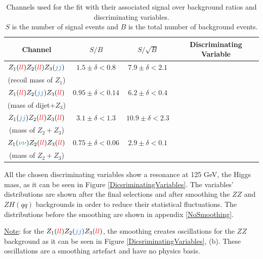 \documentclass[a4paper,11pt]{article}
\begin{document}
    \begin{table}[h!]
        \centering
        \begin{tabular}{|c|c|c|c|}
            \hline
            Channel & $S/B$ & $S/\sqrt{B}$ & Discriminating Variable \\
            \hline
            $Z_1(\textcolor{red}{ll})Z_2(\textcolor{red}{ll})Z_3(\textcolor{NavyBlue}{jj})$ & $1.5\pm\delta<0.8$ & $7.9\pm\delta<2.1$ & \thead{$m^{\mbox{rec}}_{ll_1}$\\(recoil mass of $Z_1$)} \\
            $Z_1(\textcolor{red}{ll})Z_2(\textcolor{NavyBlue}{jj})Z_3(\textcolor{red}{ll})$ & $0.95\pm\delta<0.14$ & $6.2\pm\delta<0.4$ & \thead{$m_{jj+ll_3}$\\(mass of dijet+$Z_3$)} \\
            $Z_1(\textcolor{NavyBlue}{jj})Z_2(\textcolor{red}{ll})Z_3(\textcolor{red}{ll})$ & $3.1\pm\delta<1.3$ & $10.9\pm\delta<2.3$ & \thead{$m_{ll_2+ll_3}$\\(mass of $Z_2+Z_3$)} \\
            $Z_1(\textcolor{Green}{\nu\nu})Z_2(\textcolor{red}{ll})Z_3(\textcolor{red}{ll})$ & $0.75\pm\delta<0.06$ & $2.9\pm\delta<0.1$ & \thead{$m_{ll_2+ll_3}$\\(mass of $Z_2+Z_3$)} \\
            \hline
        \end{tabular}
        \caption[Channels used for the fit with their associated signal over background ratios and discriminating variables.]
        {Channels used for the fit with their associated signal over background ratios and discriminating variables.\\$S$ is the number of signal events and $B$ is the total number of background events.}
        \label{FitChannels}
    \end{table}

    \noindent
    All the chosen discriminating variables show a resonance at 125 GeV, the Higgs mass, as  it can be seen in Figure \ref{DicsriminatingVariables}. The variables' distributions are shown after the final selections and after smoothing the $ZZ$ and $ZH(qq)$ backgrounds in order to reduce their statistical fluctuations. The distributions before the smoothing are shown in appendix \ref{NoSmoothing}.

    \newpage
    \noindent
    \underline{Note}: for the $Z_1(\textcolor{red}{ll})Z_2(\textcolor{NavyBlue}{jj})Z_3(\textcolor{red}{ll})$, the smoothing creates oscillations for the $ZZ$ background as it can be seen in Figure \ref{DicsriminatingVariables}, (b). These oscillations are a smoothing artefact and have no physics basis.
    
\end{document}
